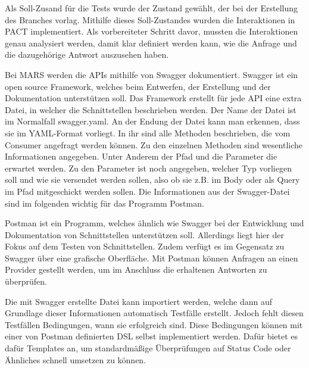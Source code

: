 \documentclass{llncs}
\begin{document}
Als Soll-Zusand für die Tests wurde der Zustand gewählt, der bei der Erstellung des Branches vorlag. Mithilfe dieses Soll-Zustandes wurden die Interaktionen in PACT implementiert. Als vorbereiteter Schritt davor, mussten die Interaktionen genau analysiert werden, damit klar definiert werden kann, wie die Anfrage und die dazugehörige Antwort auszusehen haben.

Bei MARS werden die APIs mithilfe von Swagger\citep{swagger} dokumentiert. Swagger ist ein open source Framework, welches beim Entwerfen, der Erstellung und der Dokumentation unterstützen soll. Das Framework erstellt für jede API eine extra Datei, in welcher die Schnittstellen beschrieben werden. Der Name der Datei ist im Normalfall swagger.yaml. An der Endung der Datei kann man erkennen, dass sie im YAML-Format vorliegt. In ihr sind alle Methoden beschrieben, die vom Consumer angefragt werden können. Zu den einzelnen Methoden sind wesentliche Informationen angegeben. Unter Anderem der Pfad und die Parameter die erwartet werden. Zu den Parameter ist noch angegeben, welcher Typ vorliegen soll und wie sie versendet werden sollen, also ob sie z.B. im Body oder als Query im Pfad mitgeschickt werden sollen. Die Informationen aus der Swagger-Datei sind im folgenden wichtig für das Programm Postman.

Postman \cite{postman} ist ein Programm, welches ähnlich wie Swagger bei der Entwicklung und Dokumentation von Schnittstellen unterstützen soll. Allerdings liegt hier der Fokus  auf dem Testen von Schnittstellen. Zudem verfügt es im Gegensatz zu Swagger über eine grafische Oberfläche. Mit Postman können Anfragen an einen Provider gestellt werden, um im Anschluss die erhaltenen Antworten zu überprüfen. 

Die mit Swagger erstellte Datei kann importiert werden, welche dann auf Grundlage dieser Informationen automatisch Testfälle erstellt. Jedoch fehlt diesen Testfällen Bedingungen, wann sie erfolgreich sind. Diese Bedingungen können mit einer von Postman definierten DSL selbst implementiert werden. Dafür bietet es dafür Templates an, um standardmäßige Überprüfungen auf Status Code oder Ähnliches schnell umsetzen zu können.
\end{document}
